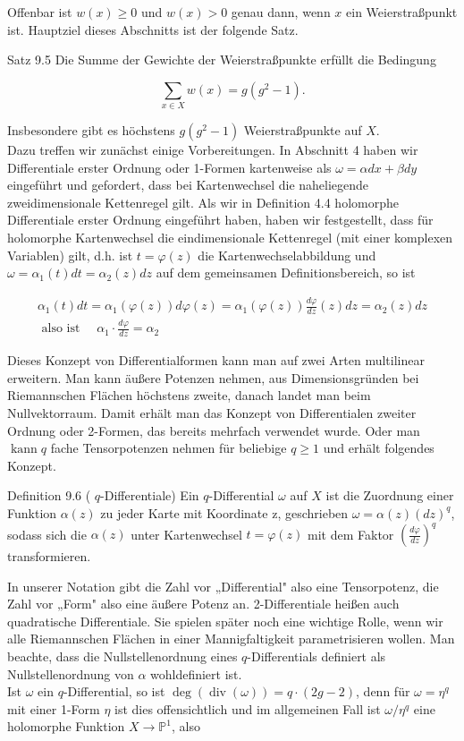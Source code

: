 \documentclass[10pt, letterpaper]{article}
\begin{document}
Offenbar ist $w(x) \geqslant 0$ und $w(x)>0$ genau dann, wenn $x$ ein Weierstraßpunkt ist. Hauptziel dieses Abschnitts ist der folgende Satz.

Satz 9.5 Die Summe der Gewichte der Weierstraßpunkte erfüllt die Bedingung

$$
\sum_{x \in X} w(x)=g\left(g^{2}-1\right) .
$$

Insbesondere gibt es höchstens $g\left(g^{2}-1\right)$ Weierstraßpunkte auf $X$.\\
Dazu treffen wir zunächst einige Vorbereitungen. In Abschnitt 4 haben wir Differentiale erster Ordnung oder 1-Formen kartenweise als $\omega=\alpha d x+\beta d y$ eingeführt und gefordert, dass bei Kartenwechsel die naheliegende zweidimensionale Kettenregel gilt. Als wir in Definition 4.4 holomorphe Differentiale erster Ordnung eingeführt haben, haben wir festgestellt, dass für holomorphe Kartenwechsel die eindimensionale Kettenregel (mit einer komplexen Variablen) gilt, d.h. ist $t=\varphi(z)$ die Kartenwechselabbildung und $\omega=\alpha_{1}(t) d t= \alpha_{2}(z) d z$ auf dem gemeinsamen Definitionsbereich, so ist

$$
\begin{gathered}
\alpha_{1}(t) d t=\alpha_{1}(\varphi(z)) d \varphi(z)=\alpha_{1}(\varphi(z)) \frac{d \varphi}{d z}(z) d z=\alpha_{2}(z) d z \\
\text { also ist } \quad \alpha_{1} \cdot \frac{d \varphi}{d z}=\alpha_{2}
\end{gathered}
$$

Dieses Konzept von Differentialformen kann man auf zwei Arten multilinear erweitern. Man kann äußere Potenzen nehmen, aus Dimensionsgründen bei Riemannschen Flächen höchstens zweite, danach landet man beim Nullvektorraum. Damit erhält man das Konzept von Differentialen zweiter Ordnung oder 2-Formen, das bereits mehrfach verwendet wurde. Oder man $\operatorname{kann} q$ fache Tensorpotenzen nehmen für beliebige $q \geqslant 1$ und erhält folgendes Konzept.

Definition 9.6 ( $q$-Differentiale) Ein $q$-Differential $\omega$ auf $X$ ist die Zuordnung einer Funktion $\alpha(z)$ zu jeder Karte mit Koordinate z, geschrieben $\omega=\alpha(z)(d z)^{q}$, sodass sich die $\alpha(z)$ unter Kartenwechsel $t=\varphi(z)$ mit dem Faktor $\left(\frac{d \varphi}{d z}\right)^{q}$ transformieren.

In unserer Notation gibt die Zahl vor „Differential" also eine Tensorpotenz, die Zahl vor „Form" also eine äußere Potenz an. 2-Differentiale heißen auch quadratische Differentiale. Sie spielen später noch eine wichtige Rolle, wenn wir alle Riemannschen Flächen in einer Mannigfaltigkeit parametrisieren wollen. Man beachte, dass die Nullstellenordnung eines $q$-Differentials definiert als Nullstellenordnung von $\alpha$ wohldefiniert ist.\\
Ist $\omega$ ein $q$-Differential, so ist $\operatorname{deg}(\operatorname{div}(\omega))=q \cdot(2 g-2)$, denn für $\omega=\eta^{q}$ mit einer 1-Form $\eta$ ist dies offensichtlich und im allgemeinen Fall ist $\omega / \eta^{q}$ eine holomorphe Funktion $X \longrightarrow \mathbb{P}^{1}$, also
\end{document}

